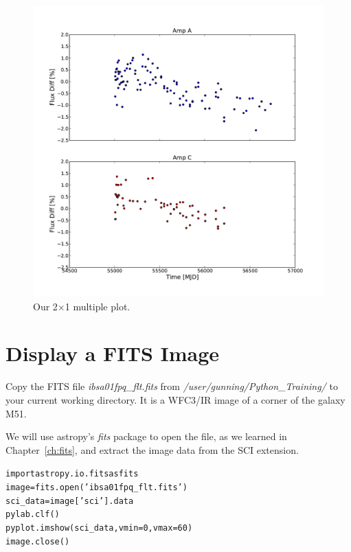 \begin{figure}[tbp]
  \centering
    \includegraphics[scale=0.35]{flux_vs_time_4.pdf}
    \caption{Our 2$\times$1 multiple plot.}
  \label{fig:flux_vs_time_4}
\end{figure}


\section{Display a FITS Image}

Copy the FITS file \textit{ibsa01fpq\_flt.fits} from \textit{/user/gunning/Python\_Training/} to your current working directory. It
is a WFC3/IR image of a corner of the galaxy M51.

We will use astropy's \textit{fits} package to open the file, as we learned in Chapter~\ref{ch:fits},
and extract the image data from the SCI extension.  

\begin{alltt}
\pytab import astropy.io.fits as fits
\pytab image = fits.open('ibsa01fpq_flt.fits')
\pytab sci_data = image['sci'].data
\pytab pylab.clf()
\pytab pyplot.imshow(sci_data, vmin=0, vmax=60)
\pytab image.close()
\end{alltt}

